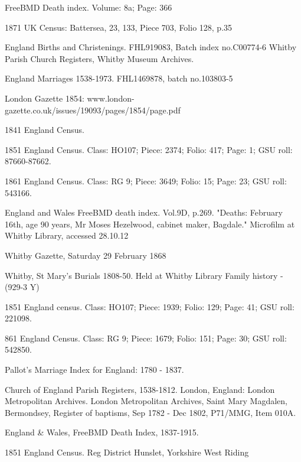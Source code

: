 \begin{thebibliography}{99}
	FreeBMD Death index. Volume: 8a; Page: 366
	
	1871 UK Census: Battersea, 23, 133, Piece 703, Folio 128, p.35 
	
	 England Births and Christenings. FHL919083, Batch index no.C00774-6
	 Whitby Parish Church Registers, Whitby Museum Archives.
	 
	 England Marriages 1538-1973. FHL1469878, batch no.103803-5
	 
	London Gazette 1854: www.london-gazette.co.uk/issues/19093/pages/1854/page.pdf
	
	1841 England Census. 
	
	1851 England Census. Class: HO107; Piece: 2374; Folio: 417; Page: 1; GSU roll: 87660-87662.
	
	1861 England Census. Class: RG 9; Piece: 3649; Folio: 15; Page: 23; GSU roll: 543166.
	
	England and Wales FreeBMD death index. Vol.9D, p.269. 
	"Deaths: February 16th, age 90 years, Mr Moses Hezelwood, cabinet maker, Bagdale." Microfilm at Whitby 			Library, accessed 28.10.12
	
	Whitby Gazette, Saturday 29 February 1868
	
	Whitby, St Mary's Burials 1808-50. Held at Whitby Library Family history - (929-3 Y)
	
	 1851 England census. Class: HO107; Piece: 1939; Folio: 129; Page: 41; GSU roll: 221098.
	 
	861 England Census. Class: RG 9; Piece: 1679; Folio: 151; Page: 30; GSU roll: 542850.
	
	 Pallot's Marriage Index for England: 1780 - 1837.
	 
	Church of England Parish Registers, 1538-1812. London, England: London Metropolitan Archives.
	London Metropolitan Archives, Saint Mary Magdalen, Bermondsey, Register of baptisms, Sep 1782 - Dec 1802, 		P71/MMG, Item 010A.
	
	England & Wales, FreeBMD Death Index, 1837-1915. 
	
	1851 England Census. Reg District Hunslet, Yorkshire West Riding
	

\end{thebibliography}
